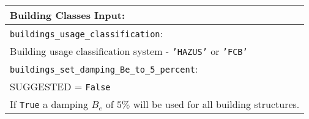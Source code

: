 \vspace{2em}
\begin{tabular}{|p{\textwidth}|}
\hline
\vspace{0.3em} \noindent \Large \textbf{Building Classes Input:} \normalsize \\
\hline \vspace{0.1em} \texttt{buildings\_usage\_classification}: \\
Building usage classification system - \texttt{'HAZUS'} or \texttt{'FCB'} \\
\hline \vspace{0.1em}
\texttt{buildings\_set\_damping\_Be\_to\_5\_percent}: \\
SUGGESTED = \texttt{False} \\
If \texttt{True} a damping $B_e$ of $5\%$ will be used for all building structures.\\
\hline
 \end{tabular}

